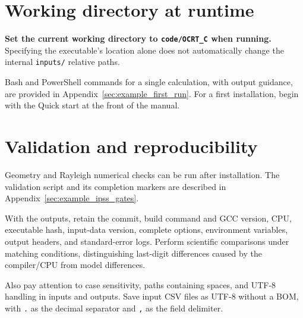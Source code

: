 \section{Working directory at runtime}
\label{sec:auto:02_installation:5}
\textbf{Set the current working directory to \texttt{code/\allowbreak{}OCRT\_\allowbreak{}C} when running.} Specifying the executable's location alone does not automatically change the internal \texttt{inputs/\allowbreak{}} relative paths.

Bash and PowerShell commands for a single calculation, with output guidance, are provided in Appendix~\ref{sec:example_first_run}. For a first installation, begin with the Quick start at the front of the manual.

\section{Validation and reproducibility}
\label{sec:auto:02_installation:6}
Geometry and Rayleigh numerical checks can be run after installation. The validation script and its completion markers are described in Appendix~\ref{sec:example_ipss_gates}.

With the outputs, retain the commit, build command and GCC version, CPU, executable hash, input-data version, complete options, environment variables, output headers, and standard-error logs. Perform scientific comparisons under matching conditions, distinguishing last-digit differences caused by the compiler/CPU from model differences.

Also pay attention to case sensitivity, paths containing spaces, and UTF-8 handling in inputs and outputs. Save input CSV files as UTF-8 without a BOM, with \texttt{.\allowbreak{}} as the decimal separator and \texttt{,\allowbreak{}} as the field delimiter.


